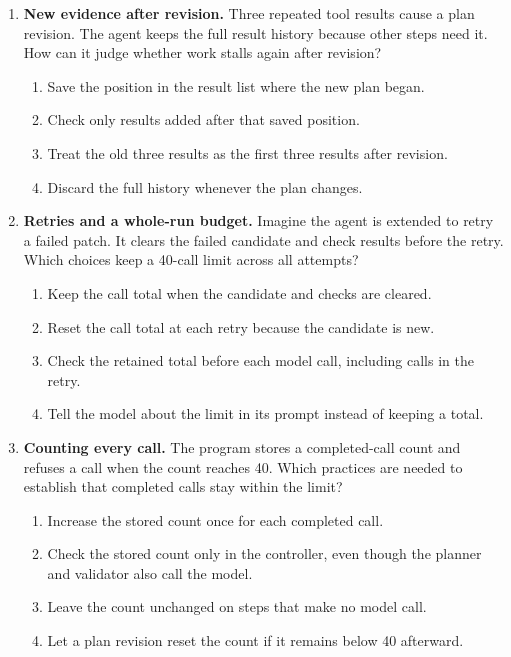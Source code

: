 \begin{enumerate}[start=11,itemsep=0.7\baselineskip]
\item\label{exercise:17} \begin{minipage}[t]{\linewidth}
\textbf{New evidence after revision.} Three repeated tool results cause a plan revision. The agent keeps the full result history because other steps need it. How can it judge whether work stalls again after revision?
\begin{enumerate}[label=\textnormal{(\Alph*)},leftmargin=*,itemsep=0pt]
\item Save the position in the result list where the new plan began.
\item Check only results added after that saved position.
\item Treat the old three results as the first three results after revision.
\item Discard the full history whenever the plan changes.
\end{enumerate}
\end{minipage}

\item\label{exercise:18} \begin{minipage}[t]{\linewidth}
\textbf{Retries and a whole-run budget.} Imagine the agent is extended to retry a failed patch. It clears the failed candidate and check results before the retry. Which choices keep a 40-call limit across all attempts?
\begin{enumerate}[label=\textnormal{(\Alph*)},leftmargin=*,itemsep=0pt]
\item Keep the call total when the candidate and checks are cleared.
\item Reset the call total at each retry because the candidate is new.
\item Check the retained total before each model call, including calls in the retry.
\item Tell the model about the limit in its prompt instead of keeping a total.
\end{enumerate}
\end{minipage}

\item\label{exercise:19} \begin{minipage}[t]{\linewidth}
\textbf{Counting every call.} The program stores a completed-call count and refuses a call when the count reaches 40. Which practices are needed to establish that completed calls stay within the limit?
\begin{enumerate}[label=\textnormal{(\Alph*)},leftmargin=*,itemsep=0pt]
\item Increase the stored count once for each completed call.
\item Check the stored count only in the controller, even though the planner and validator also call the model.
\item Leave the count unchanged on steps that make no model call.
\item Let a plan revision reset the count if it remains below 40 afterward.
\end{enumerate}
\end{minipage}


\end{enumerate}
